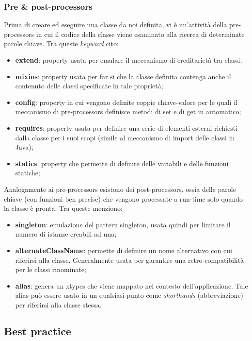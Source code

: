 \documentclass[10pt,a4paper,onecolumn]{article}
\begin{document}
\subsubsection{Pre \& post-processors}
Prima di creare ed eseguire una classe da noi definita, vi è un'attività della pre-processors in cui il codice della classe viene esaminato alla ricerca di determinate parole chiave. Tra queste \emph{keyword} cito:
\begin{itemize}
	\item \textbf{extend}: property usata per emulare il meccanismo di ereditarietà tra classi;
	\item \textbf{mixins}: property usata per far si che la classe definita contenga anche il contenuto delle classi specificate in tale proprietà;
	\item \textbf{config}: property in cui vengono definite coppie chiave-valore per le quali il meccanismo di pre-processors definisce metodi di set e di get in automatico;
	\item \textbf{requires}: property usata per definire una serie di elementi esterni richiesti dalla classe per i suoi scopi (simile al meccanismo di import delle classi in Java);
	\item \textbf{statics}: property che permette di definire delle variabili e delle funzioni statiche;
\end{itemize}
Analogamente ai pre-processors esistono dei post-processors, ossia delle parole chiave (con funzioni ben precise) che vengono processate a run-time solo quando la classe è pronta. Tra queste menziono:
\begin{itemize}
	\item \textbf{singleton}: emulazione del pattern singleton, usata quindi per limitare il numero di istanze creabili ad una;
	\item \textbf{alternateClassName}: permette di definire un nome alternativo con cui riferirsi alla classe. Generalmente usata per garantire una retro-compatibilità per le classi rinominate;
    \item \textbf{alias}: genera un xtypes che viene mappato nel contesto dell'applicazione. Tale alias può essere usato in un qualsiasi punto come \emph{shorthands} (abbreviazione) per riferirsi alla classe stessa.
\end{itemize}

\subsection{Best practice}
\end{document}
